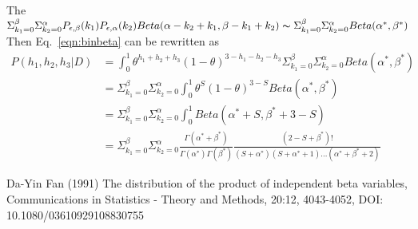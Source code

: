 \documentclass{article}
\begin{document}
The $\Sigma_{k_1=0}^\beta \Sigma_{k_2=0}^\alpha P_{\epsilon,\beta}(k_1) P_{\epsilon,\alpha}(k_2) Beta(\alpha-k_2+k_1,\beta-k_1+k_2) \thicksim \Sigma_{k_1=0}^\beta \Sigma_{k_2=0}^\alpha Beta(\alpha^\ast,\beta^\ast)$
Then Eq.~\ref{eqn:binbeta} can be rewritten as
\begin{equation}
\begin{split}
P(h_1,h_2,h_3|D)&=\int_{0}^1 \theta^{h_1+h_2+h_3}(1-\theta)^{3-h_1-h_2-h_3}\Sigma_{k_1=0}^\beta \Sigma_{k_2=0}^\alpha Beta(\alpha^\ast,\beta^\ast)\\
&=\Sigma_{k_1=0}^\beta \Sigma_{k_2=0}^\alpha\int_{0}^1 \theta^{S}(1-\theta)^{3-S}Beta(\alpha^\ast,\beta^\ast)\\
&=\Sigma_{k_1=0}^\beta \Sigma_{k_2=0}^\alpha \int_{0}^1 Beta(\alpha^\ast+S,\beta^\ast+3-S)\\
&=\Sigma_{k_1=0}^\beta \Sigma_{k_2=0}^\alpha \frac{\Gamma(\alpha^\ast+\beta^\ast)}{\Gamma(\alpha^\ast)\Gamma(\beta^\ast)}\frac{(2-S+\beta^\ast)!}{(S+\alpha^\ast)(S+\alpha^\ast+1)...(\alpha^\ast+\beta^\ast+2)}
\end{split}
\end{equation}\label{eqn:binbeta}





\begin{thebibliography}{10}
Da-Yin Fan (1991) The distribution of the product of independent beta variables, Communications in
Statistics - Theory and Methods, 20:12, 4043-4052, DOI: 10.1080/03610929108830755
\end{thebibliography}
\end{document}
